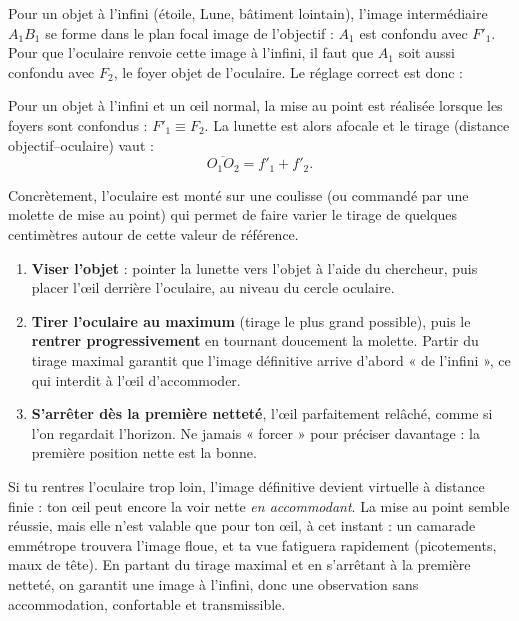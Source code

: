 \documentclass[11pt]{article}
\newcommand{\cle}[1]{{\popxbold\color{popdark}#1}}
\begin{document}
Pour un objet à l'infini (étoile, Lune, bâtiment lointain), l'image intermédiaire $A_1B_1$ se forme dans le plan focal image de l'objectif : $A_1$ est confondu avec $F'_1$. Pour que l'oculaire renvoie cette image à l'infini, il faut que $A_1$ soit aussi confondu avec $F_2$, le foyer objet de l'oculaire. Le réglage correct est donc :

\begin{propriete}
Pour un objet à l'infini et un œil normal, la mise au point est réalisée lorsque les foyers sont confondus : $F'_1 \equiv F_2$. La lunette est alors \cle{afocale} et le \cle{tirage} (distance objectif--oculaire) vaut :
\[ \overline{O_1O_2} = f'_1 + f'_2. \]
\end{propriete}

Concrètement, l'oculaire est monté sur une coulisse (ou commandé par une molette de mise au point) qui permet de faire varier le tirage de quelques centimètres autour de cette valeur de référence.

\begin{methode}
\begin{enumerate}
\item \textbf{Viser l'objet} : pointer la lunette vers l'objet à l'aide du chercheur, puis placer l'œil derrière l'oculaire, au niveau du cercle oculaire.
\item \textbf{Tirer l'oculaire au maximum} (tirage le plus grand possible), puis le \textbf{rentrer progressivement} en tournant doucement la molette. Partir du tirage maximal garantit que l'image définitive arrive d'abord « de l'infini », ce qui interdit à l'œil d'accommoder.
\item \textbf{S'arrêter dès la première netteté}, l'œil parfaitement relâché, comme si l'on regardait l'horizon. Ne jamais « forcer » pour préciser davantage : la première position nette est la bonne.
\end{enumerate}
\end{methode}

\begin{attention}
Si tu rentres l'oculaire trop loin, l'image définitive devient virtuelle à distance finie : ton œil peut encore la voir nette \emph{en accommodant}. La mise au point semble réussie, mais elle n'est valable que pour ton œil, à cet instant : un camarade emmétrope trouvera l'image floue, et ta vue fatiguera rapidement (picotements, maux de tête). En partant du tirage maximal et en s'arrêtant à la première netteté, on garantit une image à l'infini, donc une observation sans accommodation, confortable et transmissible.
\end{attention}
\end{document}

